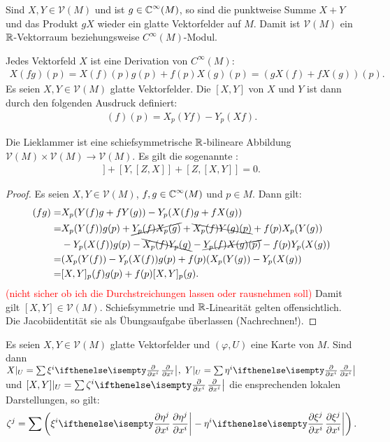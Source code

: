 \begin{bem}
  Sind $X,Y \in \mathcal V(M)$ und ist $g \in \operatorname{\mathbb{C}}^{\infty}(M)$, so sind die punktweise Summe $X+Y$ und das Produkt $gX$ wieder ein glatte Vektorfelder auf $M$. Damit ist $\mathcal V(M)$ ein $\operatorname{\mathbb{R}}$-Vektorraum beziehungsweise $C^{\infty}(M)$-Modul.
  
  Jedes Vektorfeld $X$ ist eine Derivation von $C^{\infty}(M)$:
  \begin{align*}
    X(fg)(p) = X(f)(p)g(p) + f(p) X(g)(p) = \left(gX(f) + fX(g)\right)(p).
  \end{align*}
  Es seien $X,Y \in \mathcal V(M)$ glatte Vektorfelder. Die  $[X,Y]$ von $X$ und $Y$ ist dann durch den folgenden Ausdruck definiert:
  \begin{align*}
    [X,Y](f)(p) = X_p(Yf)-Y_p(Xf).
  \end{align*}
\end{bem}

\begin{Lemma}
  Die Lieklammer ist eine schiefsymmetrische $\operatorname{\mathbb{R}}$-bilineare Abbildung $\mathcal V(M) \times \mathcal V(M) \to \mathcal V(M)$. Es gilt die sogenannte :
  \begin{align*}
    [X,[Y,Z]] + [Y,[Z,X]] + [Z,[X,Y]] = 0.
  \end{align*}
\end{Lemma}

\begin{proof}
  Es seien $X,Y \in \mathcal V(M)$, $f,g \in \operatorname{\mathbb{C}}^{\infty}(M)$ und $p \in M$. Dann gilt:
  \begin{align*}
    [X,Y](fg)  = & X_p(Y(f)g + fY(g)) - Y_p(X(f)g+fX(g))\\
    = & X_p(Y(f))g(p) + \cancel{Y_p(f)X_p(g)} + \bcancel{X_p(f)Y(g)(p)} + f(p)X_p(Y(g))\\
    & - Y_p(X(f))g(p) - \bcancel{X_p(f)Y_p(g)} - \cancel{Y_p(f)X(g)(p)} - f(p)Y_p(X(g))\\
    = & (X_p(Y(f))-Y_p(X(f))g(p) + f(p)(X_p(Y(g))-Y_p(X(g))\\
    = & [X,Y]_p (f)g(p) + f(p)[X,Y]_p(g).
  \end{align*}
  \textcolor{red}{(nicht sicher ob ich die Durchstreichungen lassen oder rausnehmen soll)}
  Damit gilt $[X,Y] \in \mathcal V(M)$. Schiefsymmetrie und $\operatorname{\mathbb{R}}$-Linearität gelten offensichtlich. Die Jacobiidentität sie als Übungsaufgabe überlassen (Nachrechnen!).
\end{proof}


\begin{Lemma}
  Es seien $X,Y \in \mathcal V(M)$ glatte Vektorfelder und $(\varphi,U)$ eine Karte von $M$.
  Sind dann $X|_U = \sum \xi^i\pdifffrac{}{x^i}, \ Y|_U = \sum \eta^i \pdifffrac{}{x^i}$ und $[X,Y]|_U = \sum \zeta^i \pdifffrac{}{x^i}$ die ensprechenden lokalen Darstellungen, so gilt:
  \begin{align*}
    \zeta^j = \sum \left(\xi^i\pdifffrac{\eta^j}{x^i} - \eta^i \pdifffrac{\xi^j}{x^i} \right).
  \end{align*}
\end{Lemma} 

